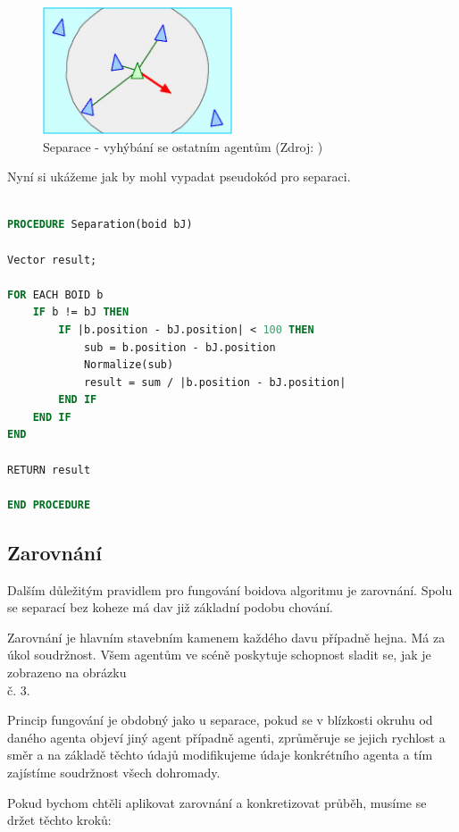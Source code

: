 \documentclass[czech,public,dept460,male,cpdeclaration]{diploma}
\begin{document}
\begin{figure}[H]\centering\includegraphics[width=0.5\textwidth]{Figures/separation.jpg}
	\caption{Separace - vyhýbání se ostatním agentům (Zdroj: \cite{link2})}
\end{figure}

\newpage Nyní si ukážeme jak by mohl vypadat pseudokód pro separaci.

\begin{lstlisting}[language=pascal,label=src:Separation pseudocode,caption=Pseudokód pro separaci]

PROCEDURE Separation(boid bJ)

Vector result;

FOR EACH BOID b
	IF b != bJ THEN
		IF |b.position - bJ.position| < 100 THEN			
			sub = b.position - bJ.position
			Normalize(sub)
			result = sum / |b.position - bJ.position|
		END IF
	END IF
END

RETURN result

END PROCEDURE

\end{lstlisting}

\subsection{Zarovnání}
Dalším důležitým pravidlem pro fungování boidova algoritmu je zarovnání. Spolu se separací bez koheze má dav již základní podobu chování. 

Zarovnání je hlavním stavebním kamenem každého davu případně hejna. Má za úkol soudržnost. Všem agentům ve scéně poskytuje schopnost sladit se, jak je zobrazeno na obrázku \\č. 3. 

Princip fungování je obdobný jako u separace, pokud se v blízkosti okruhu od daného agenta objeví jiný agent případně agenti, zprůměruje se jejich rychlost a směr a na základě těchto údajů modifikujeme údaje konkrétního agenta a tím zajístíme soudržnost všech dohromady. 

Pokud bychom chtěli aplikovat zarovnání a konkretizovat průběh, musíme se držet těchto kroků:
\end{document}
